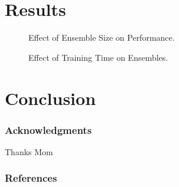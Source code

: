 \documentclass{article} %
\begin{document}
\section{Results}

\begin{figure}[H]
\begin{center}
\fbox{\rule[-.5cm]{0cm}{4cm} \rule[-.5cm]{4cm}{0cm}}
\end{center}
\caption{Effect of Ensemble Size on Performance.}
\end{figure}

\begin{figure}[H]
\begin{center}
\fbox{\rule[-.5cm]{0cm}{4cm} \rule[-.5cm]{4cm}{0cm}}
\end{center}
\caption{Effect of Training Time on Ensembles.}
\end{figure}


\section{Conclusion}
\subsubsection*{Acknowledgments}
Thanks Mom

\subsubsection*{References}
\end{document}
